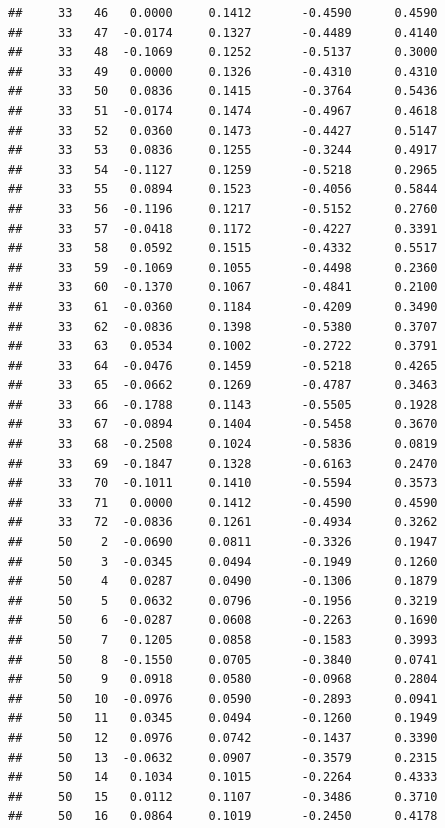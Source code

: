 \documentclass[
]{article}
\begin{document}
\begin{verbatim}
##     33   46   0.0000     0.1412       -0.4590      0.4590  
##     33   47  -0.0174     0.1327       -0.4489      0.4140  
##     33   48  -0.1069     0.1252       -0.5137      0.3000  
##     33   49   0.0000     0.1326       -0.4310      0.4310  
##     33   50   0.0836     0.1415       -0.3764      0.5436  
##     33   51  -0.0174     0.1474       -0.4967      0.4618  
##     33   52   0.0360     0.1473       -0.4427      0.5147  
##     33   53   0.0836     0.1255       -0.3244      0.4917  
##     33   54  -0.1127     0.1259       -0.5218      0.2965  
##     33   55   0.0894     0.1523       -0.4056      0.5844  
##     33   56  -0.1196     0.1217       -0.5152      0.2760  
##     33   57  -0.0418     0.1172       -0.4227      0.3391  
##     33   58   0.0592     0.1515       -0.4332      0.5517  
##     33   59  -0.1069     0.1055       -0.4498      0.2360  
##     33   60  -0.1370     0.1067       -0.4841      0.2100  
##     33   61  -0.0360     0.1184       -0.4209      0.3490  
##     33   62  -0.0836     0.1398       -0.5380      0.3707  
##     33   63   0.0534     0.1002       -0.2722      0.3791  
##     33   64  -0.0476     0.1459       -0.5218      0.4265  
##     33   65  -0.0662     0.1269       -0.4787      0.3463  
##     33   66  -0.1788     0.1143       -0.5505      0.1928  
##     33   67  -0.0894     0.1404       -0.5458      0.3670  
##     33   68  -0.2508     0.1024       -0.5836      0.0819  
##     33   69  -0.1847     0.1328       -0.6163      0.2470  
##     33   70  -0.1011     0.1410       -0.5594      0.3573  
##     33   71   0.0000     0.1412       -0.4590      0.4590  
##     33   72  -0.0836     0.1261       -0.4934      0.3262  
##     50    2  -0.0690     0.0811       -0.3326      0.1947  
##     50    3  -0.0345     0.0494       -0.1949      0.1260  
##     50    4   0.0287     0.0490       -0.1306      0.1879  
##     50    5   0.0632     0.0796       -0.1956      0.3219  
##     50    6  -0.0287     0.0608       -0.2263      0.1690  
##     50    7   0.1205     0.0858       -0.1583      0.3993  
##     50    8  -0.1550     0.0705       -0.3840      0.0741  
##     50    9   0.0918     0.0580       -0.0968      0.2804  
##     50   10  -0.0976     0.0590       -0.2893      0.0941  
##     50   11   0.0345     0.0494       -0.1260      0.1949  
##     50   12   0.0976     0.0742       -0.1437      0.3390  
##     50   13  -0.0632     0.0907       -0.3579      0.2315  
##     50   14   0.1034     0.1015       -0.2264      0.4333  
##     50   15   0.0112     0.1107       -0.3486      0.3710  
##     50   16   0.0864     0.1019       -0.2450      0.4178  

\end{verbatim}
\end{document}
